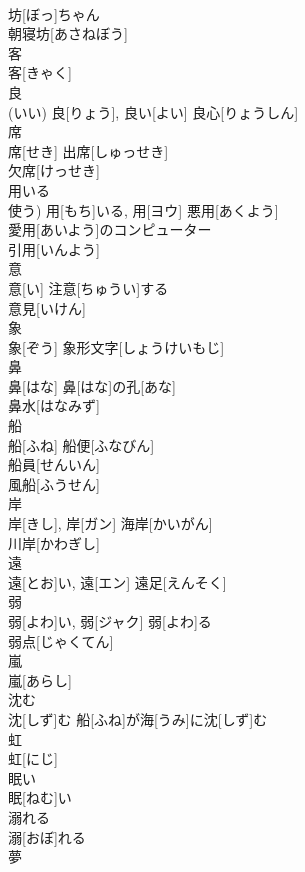 \documentclass[8pt]{extreport}
\begin{document}
\begin{CJK}{UTF8}{min}
\\	坊[ぼっ]ちゃん 
\\	朝寝坊[あさねぼう] 
\\	客	
\\	客[きゃく]	
\\	良	
\\	(いい)	良[りょう], 良い[よい]	良心[りょうしん] 
\\	席	
\\	席[せき]	出席[しゅっせき] 
\\	欠席[けっせき] 
\\	用いる	
\\	使う)	用[もち]いる, 用[ヨウ]	悪用[あくよう] 
\\	愛用[あいよう]のコンピューター 
\\	引用[いんよう] 
\\	意	
\\	意[い]	注意[ちゅうい]する 
\\	意見[いけん] 
\\	象	
\\	象[ぞう]	象形文字[しょうけいもじ] 
\\	鼻	
\\	鼻[はな]	鼻[はな]の孔[あな] 
\\	鼻水[はなみず] 
\\	船	
\\	船[ふね]	船便[ふなびん] 
\\	船員[せんいん] 
\\	風船[ふうせん] 
\\	岸	
\\	岸[きし], 岸[ガン]	海岸[かいがん] 
\\	川岸[かわぎし] 
\\	遠	
\\	遠[とお]い, 遠[エン]	遠足[えんそく] 
\\	弱	
\\	弱[よわ]い, 弱[ジャク]	弱[よわ]る 
\\	弱点[じゃくてん] 
\\	嵐	
\\	嵐[あらし]	
\\	沈む	
\\	沈[しず]む	船[ふね]が海[うみ]に沈[しず]む 
\\	虹	
\\	虹[にじ]	
\\	眠い	
\\	眠[ねむ]い	
\\	溺れる	
\\	溺[おぼ]れる	
\\	夢	

\end{CJK}
\end{document}
